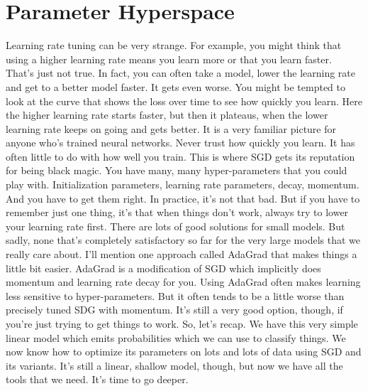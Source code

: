 \documentclass{article}
\begin{document}
\section{Parameter Hyperspace}
Learning rate tuning
can be very strange.
For example, you might think that using
a higher learning rate means you learn
more or that you learn faster.
That's just not true.
In fact, you can often take a model,
lower the learning rate and
get to a better model faster.
It gets even worse.
You might be tempted to look at the
curve that shows the loss over time to
see how quickly you learn.
Here the higher learning rate starts
faster, but then it plateaus,
when the lower learning rate
keeps on going and gets better.
It is a very familiar picture for
anyone who's trained neural networks.
Never trust how quickly you learn.
It has often little to do
with how well you train.
This is where SGD gets its
reputation for being black magic.
You have many, many hyper-parameters
that you could play with.
Initialization parameters, learning
rate parameters, decay, momentum.
And you have to get them right.
In practice, it's not that bad.
But if you have to
remember just one thing,
it's that when things don't work, always
try to lower your learning rate first.
There are lots of good solutions for
small models.
But sadly, none that's completely
satisfactory so far for
the very large models that
we really care about.
I'll mention one approach called AdaGrad
that makes things a little bit easier.
AdaGrad is a modification of SGD
which implicitly does momentum and
learning rate decay for you.
Using AdaGrad often makes learning
less sensitive to hyper-parameters.
But it often tends to be a little worse
than precisely tuned SDG with momentum.
It's still a very good option,
though, if you're just trying
to get things to work.
So, let's recap.
We have this very simple linear
model which emits probabilities
which we can use to classify things.
We now know how to optimize
its parameters on lots and
lots of data using SGD and its variants.
It's still a linear,
shallow model, though, but
now we have all the tools that we need.
It's time to go deeper.
\end{document}
